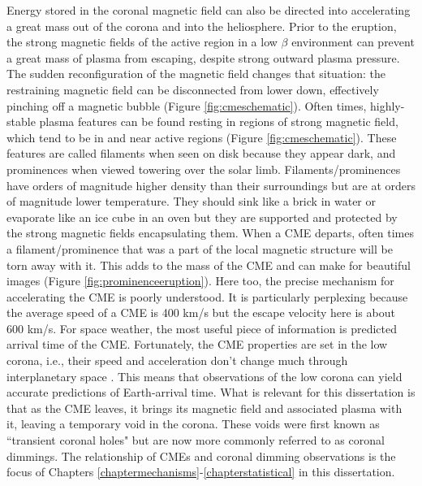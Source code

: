 Energy stored in the coronal magnetic field can also be directed into accelerating a great mass out of the corona and into the heliosphere. Prior to the eruption, the strong magnetic fields of the active region in a low $\beta$ environment can prevent a great mass of plasma from escaping, despite strong outward plasma pressure. The sudden reconfiguration of the magnetic field changes that situation: the restraining magnetic field can be disconnected from lower down, effectively pinching off a magnetic bubble (Figure \ref{fig:cmeschematic}). Often times, highly-stable plasma features can be found resting in regions of strong magnetic field, which tend to be in and near active regions (Figure \ref{fig:cmeschematic}). These features are called filaments when seen on disk because they appear dark, and prominences when viewed towering over the solar limb. Filaments/prominences have orders of magnitude higher density than their surroundings but are at orders of magnitude lower temperature. They should sink like a brick in water or evaporate like an ice cube in an oven but they are supported and protected by the strong magnetic fields encapsulating them. When a CME departs, often times a filament/prominence that was a part of the local magnetic structure will be torn away with it. This adds to the mass of the CME and can make for beautiful images (Figure \ref{fig:prominenceeruption}). Here too, the precise mechanism for accelerating the CME is poorly understood. It is particularly perplexing because the average speed of a CME is 400 km/s but the escape velocity here is about 600 km/s. For space weather, the most useful piece of information is predicted arrival time of the CME. Fortunately, the CME properties are set in the low corona, i.e., their speed and acceleration don't change much through interplanetary space \citep{Temmer2016}. This means that observations of the low corona can yield accurate predictions of Earth-arrival time. What is relevant for this dissertation is that as the CME leaves, it brings its magnetic field and associated plasma with it, leaving a temporary void in the corona. These voids were first known as ``transient coronal holes" but are now more commonly referred to as coronal dimmings. The relationship of CMEs and coronal dimming observations is the focus of Chapters \ref{chaptermechanisms}-\ref{chapterstatistical} in this dissertation. 

